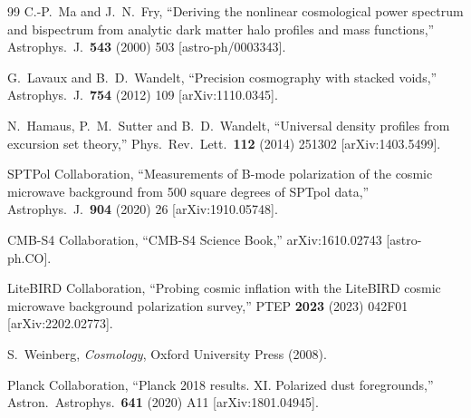 \documentclass[12pt]{article}
\theoremstyle{definition}
\begin{document}
\begin{thebibliography}{99}
C.-P.~Ma and J.~N.~Fry,
``Deriving the nonlinear cosmological power spectrum and bispectrum from
analytic dark matter halo profiles and mass functions,''
Astrophys.\ J.\ \textbf{543} (2000) 503 [astro-ph/0003343].

G.~Lavaux and B.~D.~Wandelt,
``Precision cosmography with stacked voids,''
Astrophys.\ J.\ \textbf{754} (2012) 109 [arXiv:1110.0345].

N.~Hamaus, P.~M.~Sutter and B.~D.~Wandelt,
``Universal density profiles from excursion set theory,''
Phys.\ Rev.\ Lett.\ \textbf{112} (2014) 251302 [arXiv:1403.5499].

SPTPol Collaboration,
``Measurements of B-mode polarization of the cosmic microwave background
from 500 square degrees of SPTpol data,''
Astrophys.\ J.\ \textbf{904} (2020) 26 [arXiv:1910.05748].

CMB-S4 Collaboration,
``CMB-S4 Science Book,''
arXiv:1610.02743 [astro-ph.CO].

LiteBIRD Collaboration,
``Probing cosmic inflation with the LiteBIRD cosmic microwave background
polarization survey,''
PTEP \textbf{2023} (2023) 042F01 [arXiv:2202.02773].

S.~Weinberg,
\textit{Cosmology},
Oxford University Press (2008).

Planck Collaboration,
``Planck 2018 results. XI. Polarized dust foregrounds,''
Astron.\ Astrophys.\ \textbf{641} (2020) A11 [arXiv:1801.04945].

\end{thebibliography}
\end{document}
